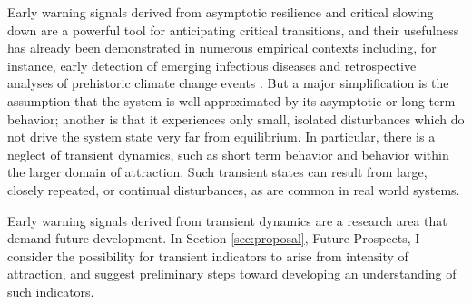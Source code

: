 Early warning signals derived from asymptotic resilience and critical slowing down are a powerful tool for anticipating critical transitions, and their usefulness has already been demonstrated in numerous empirical contexts including, for instance, early detection of emerging infectious diseases \cite{brettDynamicalFootprintsEnable2020} and retrospective analyses of prehistoric climate change events \cite{dakosSlowingEarlyWarning2008a}. But a major simplification is the assumption that the system is well approximated by its asymptotic or long-term behavior; another is that it experiences only small, isolated disturbances which do not drive the system state very far from equilibrium. In particular, there is a neglect of transient dynamics, such as short term behavior and behavior within the larger domain of attraction. Such transient states can result from large, closely repeated, or continual disturbances, as are common in real world systems. 


%

Early warning signals derived from transient dynamics are a research area that demand future development. In Section \ref{sec:proposal}, Future Prospects, I consider the possibility for transient indicators to arise from intensity of attraction, and suggest preliminary steps toward developing an understanding of such indicators. 








